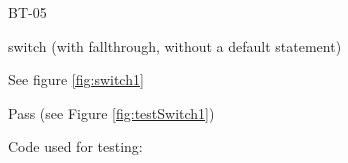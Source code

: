 \begin{figure}
\centering
\begin{minipage}{.25\textwidth}
  \centering
  \caption{}
  \label{fig:testWhile}
\end{minipage}%
\begin{minipage}{.25\textwidth}
  \centering
  \caption{}
  \label{fig:testSwitch1}
\end{minipage}%
\begin{minipage}{.25\textwidth}
  \centering
    \caption{}
  	\label{fig:testSwitch2}
\end{minipage}
\begin{minipage}{.24\textwidth}
  \centering
  \caption{}
  \label{fig:testOperation}
\end{minipage}
\end{figure}

\begin{minipage}{.6\textwidth}
\begin{description}[style=sameline,leftmargin=4.5cm,nolistsep]
\item[\hspace*{0.3cm}Label] BT-05
\item[\hspace*{0.3cm}Statement under Test] switch (with fallthrough, without a default statement)
\item[\hspace*{0.3cm}Expected Output] See figure \ref{fig:switch1}
\item[\hspace*{0.3cm}Result] Pass (see Figure \ref{fig:testSwitch1})
\end{description}
\end{minipage}
\begin{minipage}{.39\textwidth}
  \centering
  Code used for testing:
  
\end{minipage}

